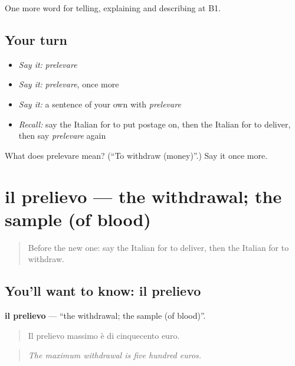 \begin{grammarlens}[title={What you've built}]
One more word for telling, explaining and describing at B1.
\end{grammarlens}

\subsection*{Your turn}
\begin{itemize}
\raggedright
  \item \emph{Say it:} \emph{prelevare}
  \item \emph{Say it:} \emph{prelevare}, once more
  \item \emph{Say it:} a sentence of your own with \emph{prelevare}
  \item \emph{Recall:} say the Italian for to put postage on, then the Italian for to deliver, then say \emph{prelevare} again
\end{itemize}

\begin{tcolorbox}[breakable,colback=teal!4,colframe=teal!35!black,title={Before you move on}]
What does prelevare mean? (\textquotedblleft{}To withdraw (money)\textquotedblright{}.) Say it once more.
\end{tcolorbox}
\section[il prelievo]{il prelievo — the withdrawal; the sample (of blood)}

\label{lesson:IT-C459-prelievo}



\begin{quote}
Before the new one: say the Italian for to deliver, then the Italian for to withdraw.
\end{quote}

\subsection*{You'll want to know: il prelievo}
\textbf{il prelievo} — \textquotedblleft{}the withdrawal; the sample (of blood)\textquotedblright{}.

\begin{quote}
Il prelievo massimo è di cinquecento euro.
\end{quote}

\begin{quote}
\emph{The maximum withdrawal is five hundred euros.}
\end{quote}

